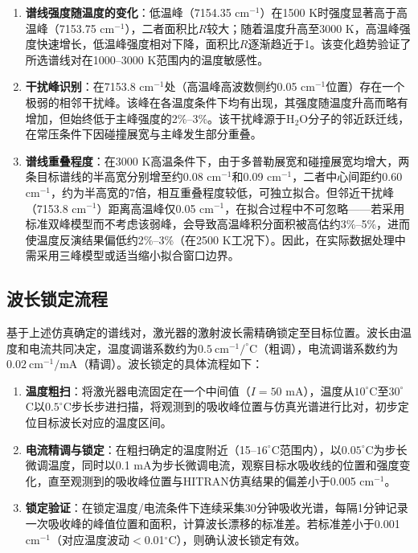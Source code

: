\begin{enumerate}
	\item \textbf{谱线强度随温度的变化}：低温峰（7154.35 cm$^{-1}$）在1500 K时强度显著高于高温峰（7153.75 cm$^{-1}$），二者面积比$R$较大；随着温度升高至3000 K，高温峰强度快速增长，低温峰强度相对下降，面积比$R$逐渐趋近于1。该变化趋势验证了所选谱线对在1000--3000 K范围内的温度敏感性。
	
	\item \textbf{干扰峰识别}：在7153.8 cm$^{-1}$处（高温峰高波数侧约0.05 cm$^{-1}$位置）存在一个极弱的相邻干扰峰。该峰在各温度条件下均有出现，其强度随温度升高而略有增加，但始终低于主峰强度的2\%--3\%。该干扰峰源于H$_2$O分子的邻近跃迁线，在常压条件下因碰撞展宽与主峰发生部分重叠。
	
	\item \textbf{谱线重叠程度}：在3000 K高温条件下，由于多普勒展宽和碰撞展宽均增大，两条目标谱线的半高宽分别增至约0.08 cm$^{-1}$和0.09 cm$^{-1}$，二者中心间距约0.60 cm$^{-1}$，约为半高宽的7倍，相互重叠程度较低，可独立拟合。但邻近干扰峰（7153.8 cm$^{-1}$）距离高温峰仅0.05 cm$^{-1}$，在拟合过程中不可忽略——若采用标准双峰模型而不考虑该弱峰，会导致高温峰积分面积被高估约3\%--5\%，进而使温度反演结果偏低约2\%--3\%（在2500 K工况下）。因此，在实际数据处理中需采用三峰模型或适当缩小拟合窗口边界。
\end{enumerate}

\subsection{波长锁定流程}

基于上述仿真确定的谱线对，激光器的激射波长需精确锁定至目标位置。波长由温度和电流共同决定，温度调谐系数约为$0.5~\text{cm}^{-1}/^\circ\text{C}$（粗调），电流调谐系数约为$0.02~\text{cm}^{-1}/\text{mA}$（精调）。波长锁定的具体流程如下：

\begin{enumerate}
	\item \textbf{温度粗扫}：将激光器电流固定在一个中间值（$I=50$ mA），温度从$10^\circ$C至$30^\circ$C以$0.5^\circ$C步长步进扫描，将观测到的吸收峰位置与仿真光谱进行比对，初步定位目标波长对应的温度区间。
	
	\item \textbf{电流精调与锁定}：在粗扫确定的温度附近（15--$16^\circ$C范围内），以$0.05^\circ$C为步长微调温度，同时以0.1 mA为步长微调电流，观察目标水吸收线的位置和强度变化，直至观测到的吸收峰位置与HITRAN仿真结果的偏差小于0.005 cm$^{-1}$。
	
	\item \textbf{锁定验证}：在锁定温度/电流条件下连续采集30分钟吸收光谱，每隔1分钟记录一次吸收峰的峰值位置和面积，计算波长漂移的标准差。若标准差小于0.001 cm$^{-1}$（对应温度波动$<$0.01$^\circ$C），则确认波长锁定有效。
\end{enumerate}

